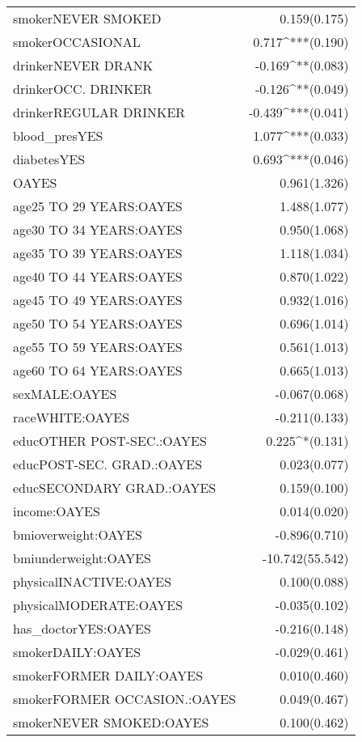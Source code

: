\begin{longtable}{@{\extracolsep{5pt}}lD{.}{.}{-3} }
  smokerNEVER SMOKED & 0.159$ $(0.175) \\ 
  smokerOCCASIONAL & 0.717^{***}$ $(0.190) \\ 
  drinkerNEVER DRANK & -0.169^{**}$ $(0.083) \\ 
  drinkerOCC. DRINKER & -0.126^{**}$ $(0.049) \\ 
  drinkerREGULAR DRINKER & -0.439^{***}$ $(0.041) \\ 
  blood\_presYES & 1.077^{***}$ $(0.033) \\ 
  diabetesYES & 0.693^{***}$ $(0.046) \\ 
  OAYES & 0.961$ $(1.326) \\ 
  age25 TO 29 YEARS:OAYES & 1.488$ $(1.077) \\ 
  age30 TO 34 YEARS:OAYES & 0.950$ $(1.068) \\ 
  age35 TO 39 YEARS:OAYES & 1.118$ $(1.034) \\ 
  age40 TO 44 YEARS:OAYES & 0.870$ $(1.022) \\ 
  age45 TO 49 YEARS:OAYES & 0.932$ $(1.016) \\ 
  age50 TO 54 YEARS:OAYES & 0.696$ $(1.014) \\ 
  age55 TO 59 YEARS:OAYES & 0.561$ $(1.013) \\ 
  age60 TO 64 YEARS:OAYES & 0.665$ $(1.013) \\ 
  sexMALE:OAYES & -0.067$ $(0.068) \\ 
  raceWHITE:OAYES & -0.211$ $(0.133) \\ 
  educOTHER POST-SEC.:OAYES & 0.225^{*}$ $(0.131) \\ 
  educPOST-SEC. GRAD.:OAYES & 0.023$ $(0.077) \\ 
  educSECONDARY GRAD.:OAYES & 0.159$ $(0.100) \\ 
  income:OAYES & 0.014$ $(0.020) \\ 
  bmioverweight:OAYES & -0.896$ $(0.710) \\ 
  bmiunderweight:OAYES & -10.742$ $(55.542) \\ 
  physicalINACTIVE:OAYES & 0.100$ $(0.088) \\ 
  physicalMODERATE:OAYES & -0.035$ $(0.102) \\ 
  has\_doctorYES:OAYES & -0.216$ $(0.148) \\ 
  smokerDAILY:OAYES & -0.029$ $(0.461) \\ 
  smokerFORMER DAILY:OAYES & 0.010$ $(0.460) \\ 
  smokerFORMER OCCASION.:OAYES & 0.049$ $(0.467) \\ 
  smokerNEVER SMOKED:OAYES & 0.100$ $(0.462) \\ 

\end{longtable}
